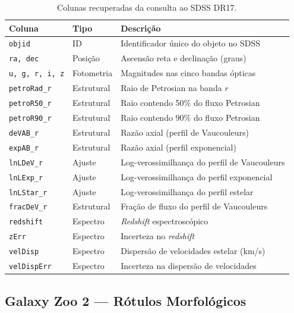\documentclass[12pt, a4paper]{article}
\begin{document}
\begin{table}[H]
  \centering
  \caption{Colunas recuperadas da consulta ao SDSS DR17.}
  \label{tab:sdss_cols}
  \begin{tabular}{llp{7.5cm}}
    \toprule
    \textbf{Coluna} & \textbf{Tipo} & \textbf{Descrição} \\
    \midrule
    \texttt{objid}       & ID      & Identificador único do objeto no SDSS \\
    \texttt{ra, dec}     & Posição & Ascensão reta e declinação (graus) \\
    \texttt{u, g, r, i, z} & Fotometria & Magnitudes nas cinco bandas ópticas \\
    \texttt{petroRad\_r} & Estrutural & Raio de Petrosian na banda $r$ \\
    \texttt{petroR50\_r} & Estrutural & Raio contendo 50\% do fluxo Petrosian \\
    \texttt{petroR90\_r} & Estrutural & Raio contendo 90\% do fluxo Petrosian \\
    \texttt{deVAB\_r}    & Estrutural & Razão axial (perfil de Vaucouleurs) \\
    \texttt{expAB\_r}    & Estrutural & Razão axial (perfil exponencial) \\
    \texttt{lnLDeV\_r}   & Ajuste & Log-verossimilhança do perfil de Vaucouleurs \\
    \texttt{lnLExp\_r}   & Ajuste & Log-verossimilhança do perfil exponencial \\
    \texttt{lnLStar\_r}  & Ajuste & Log-verossimilhança do perfil estelar \\
    \texttt{fracDeV\_r}  & Estrutural & Fração de fluxo do perfil de Vaucouleurs \\
    \texttt{redshift}    & Espectro & \textit{Redshift} espectroscópico \\
    \texttt{zErr}        & Espectro & Incerteza no \textit{redshift} \\
    \texttt{velDisp}     & Espectro & Dispersão de velocidades estelar (km/s) \\
    \texttt{velDispErr}  & Espectro & Incerteza na dispersão de velocidades \\
    \bottomrule
  \end{tabular}
\end{table}

\subsection{Galaxy Zoo 2 --- Rótulos Morfológicos}
\end{document}
